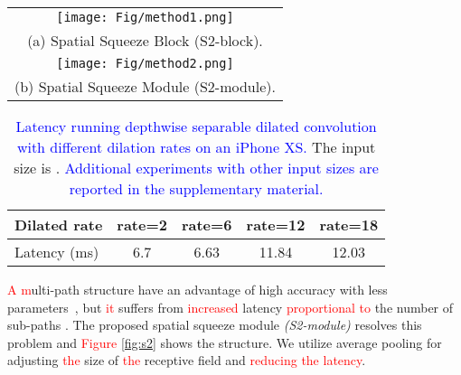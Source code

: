 \documentclass[10pt,twocolumn,letterpaper]{article}
\newcommand\Lars[1]{\textcolor{blue}{#1}}
\newcommand\nj[1]{\textcolor{red}{#1}}
\newcommand\Lars[1]{#1}
\newcommand\nj[1]{#1}
\begin{document}
\begin{figure*}[t]
\begin{center}
\begin{tabular}{c}
    \texttt{[image: Fig/method1.png]} \\ 
    (a) Spatial Squeeze Block (S2-block).     \\

        \texttt{[image: Fig/method2.png]} \\ 
    (b) Spatial Squeeze Module (S2-module).  \\
        \end{tabular}\end{center}
   \caption{(a) An input feature map is squeezed by \Lars{an}  average pooling before a depthwise convolution. Then, a bilinear upsampling recovers \Lars{the original input} resolution of \Lars{the} feature map\Lars{s}. (b) \Lars{The} S2-module has multi-receptive structures by \Lars{using} different combination\Lars{s} of convolution kernel\Lars{s} and pooling for \Lars{the} S2-block\Lars{s}.}
\label{fig:s2}
\vspace{-2mm}
\end{figure*}

\begin{table}[t]
\begin{center}

    \begin{tabular}{l | c c c c}
     \hline
     Dilated rate & rate=2 & rate=6 & rate=12 & rate=18 \\
     \hline \hline
     Latency (ms) & 6.7  & 6.63 & 11.84 & 12.03 \\
     \hline
    \end{tabular}\end{center}
      \caption{\Lars{Latency running depthwise separable dilated convolution with different dilation rates on an iPhone XS.} The input size is .  \Lars{Additional experiments with other input sizes are reported in the supplementary material.}}\label{tab:dilation_time}\end{table}

\nj{A m}ulti-path structure have an advantage of high accuracy with less parameters~\cite{wang2019elastic, szegedy2017inception, szegedy2017inception, xie2017aggregated}, but \nj{it} suffers from \nj{increased} latency \nj{proportional to} the number of sub-paths \cite{ma2018shufflenet}.
The proposed spatial squeeze module \textit{(S2-module)} resolves this problem and \nj{Figure} \ref{fig:s2} shows the structure.
We utilize average pooling for adjusting \nj{the} size of \nj{the} receptive field and \nj{reducing the latency}.
\end{document}
